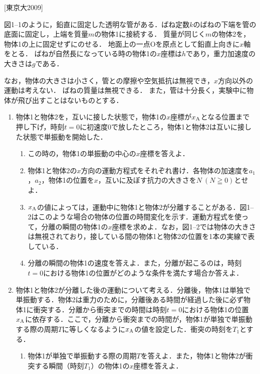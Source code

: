 

\noindent
{} [東京大2009]

図1--1のように，鉛直に固定した透明な管がある．ばね定数$k$のばねの下端を管の底面に固定し，上端を質量$m$の物体1に接続する．
質量が同じく$m$の物体2を，物体1の上に固定せずにのせる．
地面上の一点Oを原点として鉛直上向きに$x$軸をとる．
ばねが自然長になっている時の物体1の$x$座標は$h$であり，重力加速度の大きさは$g$である．

なお，物体の大きさは小さく，管との摩擦や空気抵抗は無視でき，$x$方向以外の運動は考えない．
ばねの質量は無視できる．
また，管は十分長く，実験中に物体が飛び出すことはないものとする．

\begin{enumerate}[I]
  \item {\hzw}物体1と物体2を，互いに接した状態で，物体1の$x$座標が$x_\mathrm{A}$となる位置まで押し下げ，時刻$t = 0$に初速度0で放したところ，物体1と物体2は互いに接した状態で単振動を開始した．
  \begin{enumerate}[(1)]
    \item {\hzw}この時の，物体1の単振動の中心の$x$座標を答えよ．
    \item {\hzw}物体1と物体2の$x$方向の運動方程式をそれぞれ書け．各物体の加速度を$a_1$，$a_2$，物体1の位置を$x$，互いに及ぼす抗力の大きさを$N \ (N \geqq 0)$とせよ．
    \item {\hzw}$x_\mathrm{A}$の値によっては，運動中に物体1と物体2が分離することがある．図1--2はこのような場合の物体の位置の時間変化を示す．運動方程式を使って，分離の瞬間の物体1の$x$座標を求めよ．なお，図1--2では物体の大きさは無視されており，接している間の物体1と物体2の位置を1本の実線で表している．
    \item {\hzw}分離の瞬間の物体1の速度を答えよ．また，分離が起こるのは，時刻$t=0$における物体1の位置がどのような条件を満たす場合か答えよ．
  \end{enumerate}
  \item {\hzw}物体1と物体2が分離した後の運動について考える．分離後，物体1は単独で単振動する．物体2は重力のために，分離後ある時間が経過した後に必ず物体1に衝突する．分離から衝突までの時間は時刻$t = 0$における物体1の位置$x_\mathrm{A}$に依存する．ここで，分離から衝突までの時間が，物体1が単独で単振動する際の周期$T$に等しくなるように$x_\mathrm{A}$の値を設定した．衝突の時刻を$T_1$とする．
  \begin{enumerate}[(1)]
    \item {\hzw}物体1が単独で単振動する際の周期$T$を答えよ．また，物体1と物体2が衝突する瞬間（時刻$T_1$）の物体1の$x$座標を答えよ．

\end{enumerate}
\end{enumerate}
